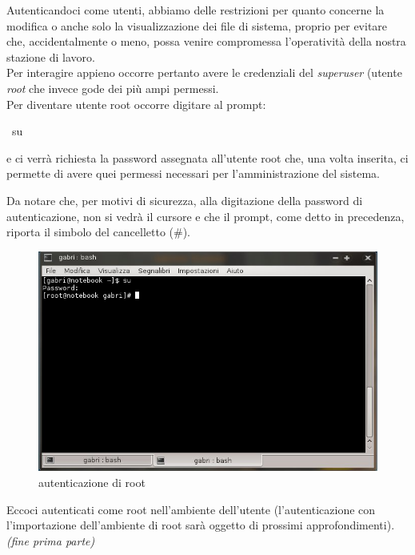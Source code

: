 Autenticandoci come utenti, abbiamo delle restrizioni per quanto concerne la modifica o anche solo la visualizzazione dei file di sistema, proprio per evitare che, accidentalmente o meno, possa venire compromessa l'operatività della nostra stazione di lavoro.\\

Per interagire appieno occorre pertanto avere le credenziali del {\itshape superuser} (utente {\itshape root} che invece gode dei più ampi permessi.\\

Per diventare utente root occorre digitare al prompt:
\begin{shaded}
{\color[cmyk]{0, 0, 0, 0}\textdollar\ su}
\end{shaded}
e ci verrà richiesta la password assegnata all'utente root che, una volta inserita, ci permette di avere quei permessi necessari per l'amministrazione del sistema.

Da notare che, per motivi di sicurezza, alla digitazione della password di autenticazione, non si vedrà il cursore e che il prompt, come detto in precedenza, riporta il simbolo del cancelletto (\#).

\begin{figure}[!ht]
\centering
\includegraphics[scale=.35]{articoli/primi_passi/immagini/root.jpeg}
\caption{autenticazione di root}
\end{figure}

Eccoci autenticati come root nell'ambiente dell'utente (l'autenticazione con l'importazione dell'ambiente di root sarà oggetto di prossimi approfondimenti).\\

\hfill {\itshape (fine prima parte)}